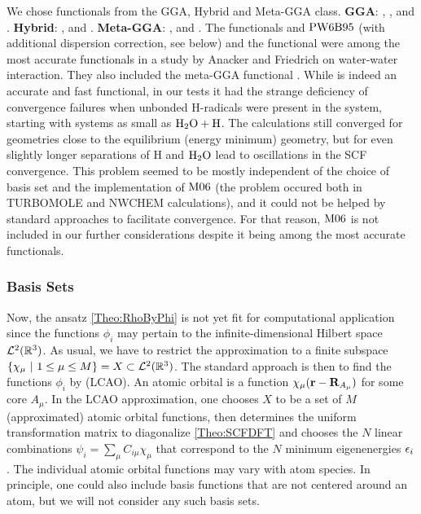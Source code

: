 \documentclass[8.5pt,twoside,twocolumn]{article}
\renewcommand\r{\bo r}
\theoremstyle{standard}
\begin{document}
We chose functionals from the GGA, Hybrid and Meta-GGA class.\newline
\textbf{GGA}: \bp, \blyp, {\pbe} and \bns\cite{GrimmeB97-D2006}.\newline
\textbf{Hybrid}: \btlyp, {\bhlyp} and \pbez. \newline
\textbf{Meta-GGA}: \tpss, {\tpssh} and \pw. \newline
The functionals {\bns} and $\text{PW6B95}$ (with additional dispersion correction, see below) and the
{\pbez} functional were among the most accurate functionals in a study by Anacker and Friedrich
\cite{Anacker2014} on water-water interaction. They also included the meta-GGA functional \mos. While
{\mos} is indeed an accurate and fast functional, in our tests it had the strange deficiency of
convergence failures when unbonded H-radicals were present in the system, starting with systems
as small as $\text H _2 \text O + \text H$. The calculations still converged for geometries close to the
equilibrium (energy minimum) geometry, but for even slightly longer separations of H and $\text H _2 \text O$
lead to oscillations in the SCF convergence. This problem seemed to be mostly independent
of the choice of basis set and the implementation of $\text{M06}$ (the problem occured both
in TURBOMOLE\cite{TURBOMOLE} and NWCHEM\cite{NWCHEM} calculations), and it could not be helped by standard approaches
to facilitate convergence. For that reason, $\text{M06}$ is not included
in our further considerations despite it being among the most accurate functionals.

\subsubsection{Basis Sets}
\label{Sec:Theo:Basis}

Now, the ansatz \eqref{Theo:RhoByPhi} is not yet fit for computational application since the
functions $\phi_i$ may pertain to the infinite-dimensional Hilbert space $\mathcal L^2(\mathbb{R}^3)$.
As usual, we have to restrict the approximation to a finite subspace $\left\{{\chi_\mu\ |\ 1 \le \mu \le M} \right\} = X \subset \mathcal L^2(\mathbb{R}^3)$.
The standard approach is then to find the functions $\phi_i$ by  (LCAO). An atomic orbital is a function $\chi_\mu(\r - \bo R_{A_\mu})$
for some core $A_\mu$. In the LCAO approximation, one chooses $X$ to be a set of $M$ (approximated) atomic orbital
functions, then determines the uniform transformation matrix to diagonalize \eqref{Theo:SCFDFT}
and chooses the $N$ linear combinations $\psi_i=\sum_\mu C_{i \mu} \chi_\mu$ that correspond to the $N$ minimum
eigenenergies $\epsilon_i$. The individual atomic orbital functions may vary with atom species. In principle,
one could also include basis functions that are not centered around an atom, but we will
not consider any such basis sets.
\end{document}
